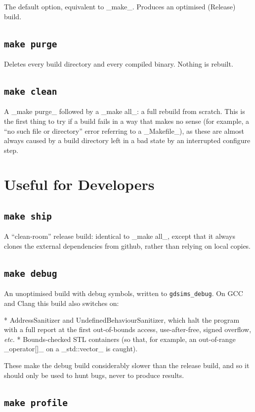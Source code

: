 		The default option, equivalent to _make_. Produces an optimised (Release) build.
	\subsection{\tt make purge}

		Deletes every build directory and every compiled binary. Nothing is rebuilt.

	\subsection{\tt make clean}

		A _make purge_ followed by a _make all_: a full rebuild from scratch. This is the first thing to try if a build fails in a way that makes no sense (for example, a ``no such file or directory'' error referring to a _Makefile_), as these are almost always caused by a build directory left in a bad state by an interrupted configure step.
\section{Useful for Developers}
	\subsection{\tt make ship}

		A ``clean-room'' release build: identical to _make all_, except that it always clones the external dependencies from github, rather than relying on local copies.

	\subsection{\tt make debug}

		An unoptimised build with debug symbols, written to \texttt{gdsims\_debug}. On GCC and Clang this build also switches on:

		* AddressSanitizer and UndefinedBehaviourSanitizer, which halt the program with a full report at the first out-of-bounds access, use-after-free, signed overflow, \textit{etc.}
		* Bounds-checked STL containers (so that, for example, an out-of-range _operator[]_ on a _std::vector_ is caught).

		These make the debug build considerably slower than the release build, and so it should only be used to hunt bugs, never to produce results.

	\subsection{\tt make profile}

